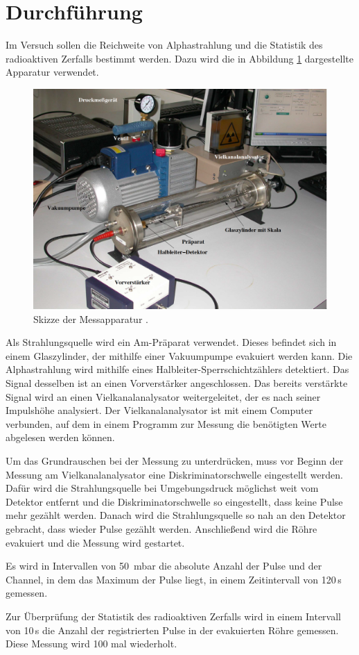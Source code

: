 \section{Durchführung}
\label{sec:Durchführung}
Im Versuch sollen die Reichweite von Alphastrahlung und die Statistik des
radioaktiven Zerfalls bestimmt werden. Dazu wird die in Abbildung \ref{fig:geraet}
dargestellte Apparatur verwendet.

\begin{figure}[H]
  \centering
  \includegraphics[width=\textwidth]{data/aufbau.png}
  \caption{Skizze der Messapparatur \cite{Versuchsanleitung}.}
  \label{fig:geraet}
\end{figure}

Als Strahlungsquelle wird ein Am-Präparat verwendet. Dieses befindet sich in einem
Glaszylinder, der mithilfe einer Vakuumpumpe evakuiert werden kann. Die Alphastrahlung
wird mithilfe eines Halbleiter-Sperrschichtzählers detektiert. Das Signal desselben ist
an einen Vorverstärker angeschlossen. Das bereits verstärkte Signal wird an einen
Vielkanalanalysator weitergeleitet, der es nach seiner Impulshöhe analysiert. Der
Vielkanalanalysator ist mit einem Computer verbunden, auf dem in einem Programm zur
Messung die benötigten Werte abgelesen werden können.

Um das Grundrauschen bei der Messung zu unterdrücken, muss vor Beginn der Messung
am Vielkanalanalysator eine Diskriminatorschwelle eingestellt werden. Dafür wird
die Strahlungsquelle bei Umgebungsdruck möglichst weit vom Detektor entfernt und
die Diskriminatorschwelle so eingestellt, dass keine Pulse mehr gezählt werden.
Danach wird die Strahlungsquelle so nah an den Detektor gebracht, dass wieder
Pulse gezählt werden. Anschließend wird die Röhre evakuiert und die Messung wird gestartet.

Es wird in Intervallen von 50\, mbar die absolute Anzahl der Pulse und der Channel,
in dem das Maximum der Pulse liegt, in einem Zeitintervall von 120\,s gemessen.

Zur Überprüfung der Statistik des radioaktiven Zerfalls wird in einem Intervall
von 10\,s die Anzahl der registrierten Pulse in der evakuierten Röhre gemessen. Diese
Messung wird 100 mal wiederholt.
